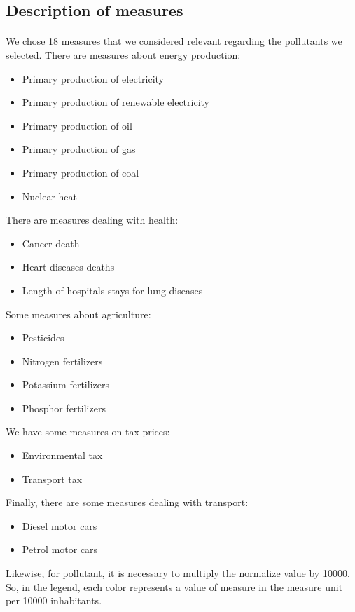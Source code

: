 \documentclass[preprint,journal]{vgtc}       %
\begin{document}
	\paragraph{}
	\subsection{Description of measures }
	\paragraph{}
	We chose 18 measures that we considered relevant regarding the pollutants we selected.
\newline
There are measures about energy production:
	\begin{itemize}
	\item Primary production of electricity
	\item Primary production of renewable electricity
	\item Primary production of oil
	\item Primary production of gas
	\item Primary production of coal
	\item Nuclear heat
	\end{itemize}
\newline	
There are measures dealing with health:
	\begin{itemize}
	\item Cancer death
	\item Heart diseases deaths
	\item Length of hospitals stays for lung diseases
	\end{itemize}
\newline
Some measures about agriculture:
	\begin{itemize}
	\item Pesticides
	\item Nitrogen fertilizers
	\item Potassium fertilizers
	\item Phosphor fertilizers
	\end{itemize}
\newline	
We have some measures on tax prices:
	\begin{itemize}
	\item Environmental tax
	\item Transport tax
	\end{itemize}
\newline	
Finally, there are some measures dealing with transport:
	\begin{itemize}
	\item Diesel motor cars
	\item Petrol motor cars
	\end{itemize}
Likewise, for pollutant, it is necessary to multiply the normalize value by 10000. So, in the legend, each color represents a value of measure in the measure unit per 10000 inhabitants.
\end{document}
